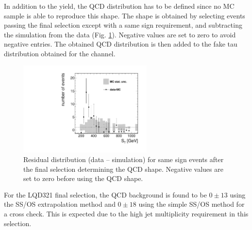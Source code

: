 In addition to the yield, the QCD \ST distribution has to be defined since no MC sample is able to reproduce this shape. The shape is obtained by selecting events passing the final selection except with a same sign requirement, and subtracting the simulation from the data (Fig. \ref{fig:residQCD}). Negative values are set to zero to avoid negative entries. The obtained QCD \ST distribution is then added to the fake tau distribution obtained for the \etau channel.

\begin{figure}[htbp]
  \begin{center}
    \includegraphics[width=0.6\textwidth]{figures/bkgEstim/residualQCD.pdf}
    \caption{Residual distribution (data -- simulation) for same sign events after the final selection determining the QCD shape. Negative values are set to zero before using the QCD shape.}
    \label{fig:residQCD}
  \end{center}
\end{figure}

For the LQD321 final selection, the QCD background is found to be $0 \pm 13$ using the SS/OS extrapolation method and $0 \pm 18$ using the simple SS/OS method for a cross check.
This is expected due to the high jet multiplicity requirement in this selection.








